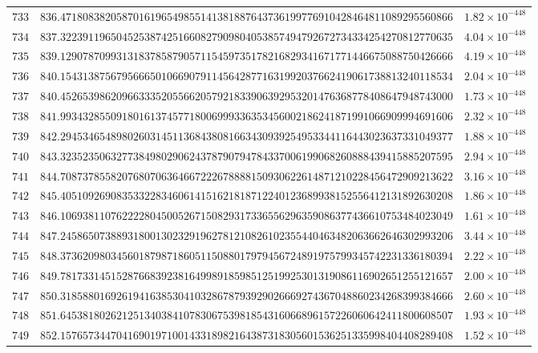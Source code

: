 \documentclass[12pt,reqno]{amsart}
\theoremstyle{remark}
\begin{document}
\begin{longtable}{clc}
$733$ & $836.4718083820587016196549855141381887643736199776910428464811089295560866$ & $1.82\times 10^{-448}$ \\
$734$ & $837.3223911965045253874251660827909804053857494792672734334254270812770635$ & $4.04\times 10^{-448}$ \\
$735$ & $839.1290787099313183785879057115459735178216829341671771446675088750426666$ & $4.19\times 10^{-448}$ \\
$736$ & $840.1543138756795666501066907911456428771631992037662419061738813240118534$ & $2.04\times 10^{-448}$ \\
$737$ & $840.4526539862096633352055662057921833906392953201476368778408647948743000$ & $1.73\times 10^{-448}$ \\
$738$ & $841.9934328550918016137457718006999336353456002186241871991066909994691606$ & $2.32\times 10^{-448}$ \\
$739$ & $842.2945346548980260314511368438081663430939254953344116443023637331049377$ & $1.88\times 10^{-448}$ \\
$740$ & $843.3235235063277384980290624378790794784337006199068260888439415885207595$ & $2.94\times 10^{-448}$ \\
$741$ & $844.7087378558207680706364667222678888150930622614871210228456472909213622$ & $3.16\times 10^{-448}$ \\
$742$ & $845.4051092690835332283460614151621818712240123689938152556412131892630208$ & $1.86\times 10^{-448}$ \\
$743$ & $846.1069381107622228045005267150829317336556296359086377436610753484023049$ & $1.61\times 10^{-448}$ \\
$744$ & $847.2458650738893180013023291962781210826102355440463482063662646302993206$ & $3.44\times 10^{-448}$ \\
$745$ & $848.3736209803456018798718605115088017979456724891975799345742231336180394$ & $2.22\times 10^{-448}$ \\
$746$ & $849.7817331451528766839238164998918598512519925301319086116902651255121657$ & $2.00\times 10^{-448}$ \\
$747$ & $850.3185880169261941638530410328678793929026669274367048860234268399384666$ & $2.60\times 10^{-448}$ \\
$748$ & $851.6453818026212513403841078306753981854316066896157226060642411800608507$ & $1.93\times 10^{-448}$ \\
$749$ & $852.1576573447041690197100143318982164387318305601536251335998404408289408$ & $1.52\times 10^{-448}$ \\

\end{longtable}
\end{document}
